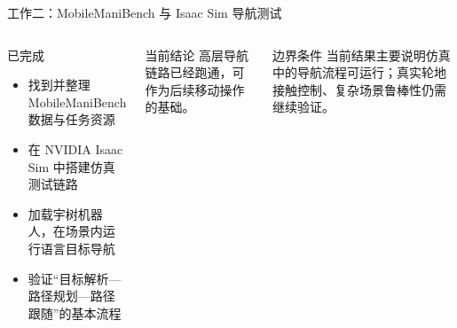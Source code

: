 \documentclass[aspectratio=169,10pt]{ctexbeamer}
\begin{document}
\begin{frame}{工作二：MobileManiBench 与 Isaac Sim 导航测试}
  \begin{columns}[T,onlytextwidth]
      \begin{block}{已完成}
        \begin{itemize}
          \item 找到并整理 MobileManiBench 数据与任务资源
          \item 在 NVIDIA Isaac Sim 中搭建仿真测试链路
          \item 加载宇树机器人，在场景内运行语言目标导航
          \item 验证“目标解析—路径规划—路径跟随”的基本流程
        \end{itemize}
      \end{block}

      \begin{block}{当前结论}
        高层导航链路已经跑通，可作为后续移动操作的基础。
      \end{block}
      \begin{alertblock}{边界条件}
        当前结果主要说明仿真中的导航流程可运行；真实轮地接触控制、复杂场景鲁棒性仍需继续验证。
      \end{alertblock}
  \end{columns}
\end{frame}
\end{document}
